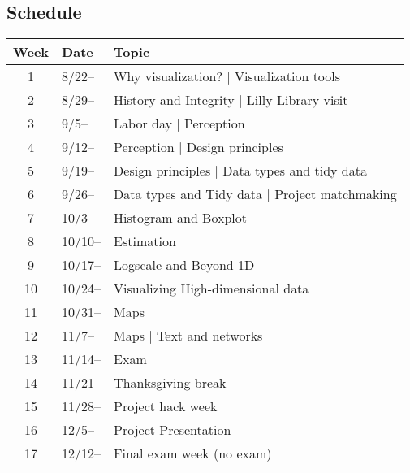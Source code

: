 \subsection{Schedule}\label{sub:schedule}%

\begin{tabular}{@{}cll@{}} \toprule
  Week & Date & Topic \\\midrule
  1 & 8/22-- & Why visualization? | Visualization tools \\
  2 & 8/29-- & History and Integrity | Lilly Library visit \\
  3 & 9/5--  & Labor day | Perception \\
  4 & 9/12--  & Perception | Design principles \\
  5 & 9/19--  & Design principles | Data types and tidy data \\
  6 & 9/26--  & Data types and Tidy data | Project matchmaking \\
  7 & 10/3--  &  Histogram and Boxplot  \\
  8 & 10/10--  & Estimation \\
  9 & 10/17--  &  Logscale and Beyond 1D \\
  10 & 10/24--  & Visualizing High-dimensional data \\
  11 & 10/31--  & Maps \\
  12 & 11/7--  & Maps | Text and networks \\
  13 & 11/14--  & Exam \\
  14 & 11/21--  & Thanksgiving break \\
  15 & 11/28--  & Project hack week \\
  16 & 12/5--  & Project Presentation \\
  17 & 12/12--  & Final exam week (no exam) \\
  \bottomrule
\end{tabular}


